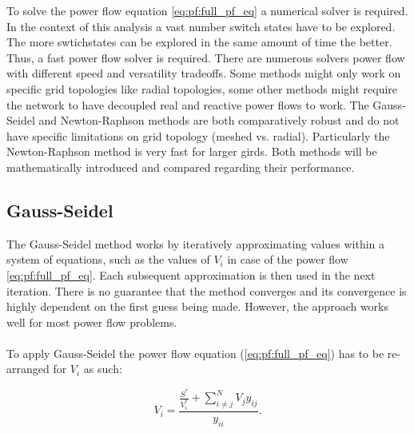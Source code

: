 
To solve the power flow equation \ref{eq:pf:full_pf_eq} a numerical solver
is required\autocite{power_system_analysis}. In the context of this analysis
a vast number switch states have to be explored. The more swtichstates
can be explored in the same amount of time the better. Thus, a fast power flow
solver is required. There are numerous solvers power flow with different speed
and versatility tradeoffs\autocite{pf_methods_comparison}. Some methods might
only work on specific grid topologies like radial topologies, some other methods
might require the network to have decoupled real and reactive power flows to work.
The Gauss-Seidel and Newton-Raphson methods are both comparatively robust and do not
have specific limitations on grid topology (meshed vs. radial)\autocite{pf_methods_comparison}.
Particularly the Newton-Raphson method is very fast for larger girds. Both methods
will be mathematically introduced and compared regarding their performance.

\subsection{Gauss-Seidel}

The Gauss-Seidel method works by iteratively approximating values
within a system of 
equations, such as the values of $V_i$ in case of the power 
flow \autoref{eq:pf:full_pf_eq}. Each subsequent approximation is
then used in the next iteration. There is no guarantee that
the method converges and its convergence is highly dependent on
the first guess being made. However, the approach
works well for most power flow problems\autocite{power_system_analysis}.\\
\\

To apply Gauss-Seidel the power flow equation (\ref{eq:pf:full_pf_eq}) has 
to be re-arranged for $V_i$ as such:

\begin{equation}
    V_i = \frac{\frac{S^*}{V_i^*} + \sum_{i \ne j}^N V_j y_{ij}}{y_{ii}}.
    \label{eq:pf:gs:start}
\end{equation}

